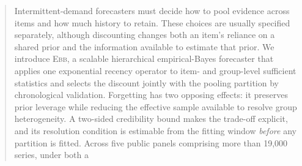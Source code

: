 \documentclass[twoside]{article}
\theoremstyle{definition}
\newcommand{\EBB}{\textsc{Ebb}}
\begin{document}
\begin{abstract}
Intermittent-demand forecasters must decide how to pool evidence across
items and how much history to retain. These choices are usually specified
separately, although discounting changes both an item's reliance on a
shared prior and the information available to estimate that prior. We
introduce \EBB{}, a scalable hierarchical empirical-Bayes forecaster
that applies one exponential recency operator to item- and group-level
sufficient statistics and selects the discount jointly with the pooling
partition by chronological validation. Forgetting has two opposing
effects: it preserves prior leverage while reducing the effective sample
available to resolve group heterogeneity. A two-sided credibility bound
makes the trade-off explicit, and its resolution condition is estimable
from the fitting window \emph{before} any partition is fitted. %
Across five
public panels comprising more than 19{,}000 series, under both a

\end{abstract}
\end{document}
